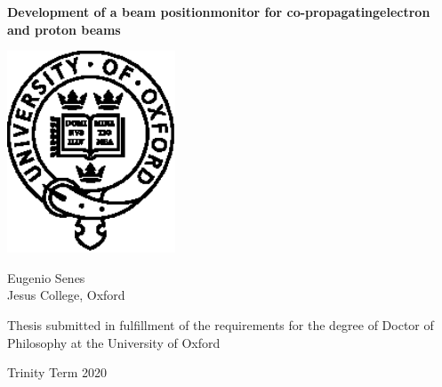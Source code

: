 \begin{titlepage}
\begin{center}
\vspace*{1.5cm}
\begin{spacing}{2.0}
{\huge \bf Development of a beam position\newline monitor for co-propagating\newline electron and proton beams}
\vspace{18mm}
\end{spacing}
\end{center}


\begin{center}
\includegraphics[width=50mm, keepaspectratio]{head/university-of-oxford-badge-logo}
\end{center}


\begin{center}
\vspace{10mm}
{\large{Eugenio Senes\\}}
\vspace{2mm}
{\large{Jesus College, Oxford}}
\end{center}


\begin{center}
\vspace{1cm}
{\large Thesis submitted in fulfillment of the requirements for the degree of Doctor of Philosophy at the University of Oxford\\}
\end{center}

\begin{center}
\vspace{7.5mm}
{\large{ 
Trinity Term 2020}}
\end{center}

\end{titlepage}
